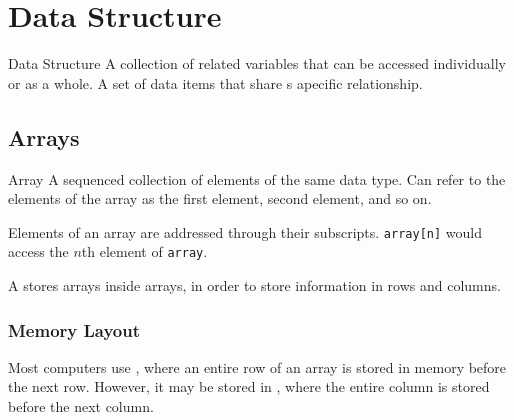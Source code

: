 \documentclass[\main/notes.tex]{subfiles}
\begin{document}
	\setcounter{chapter}{10}
	\chapter{Data Structure}
		\begin{definition}{Data Structure}
			A collection of related variables that can be accessed individually or as a whole. A set of data items that share s apecific relationship.
		\end{definition}
		\section{Arrays}
			\begin{definition}{Array}
				A sequenced collection of elements of the same data type. Can refer to the elements of the array as the first element, second element, and so on.

				Elements of an array are addressed through their subscripts. \texttt{array[n]} would access the $n$th element of \texttt{array}.
			\end{definition}
			A  stores arrays inside arrays, in order to store information in rows and columns.
			\subsection{Memory Layout}
				Most computers use , where an entire row of an array is stored in memory before the next row. However, it may be stored in , where the entire column is stored before the next column.
\end{document}
